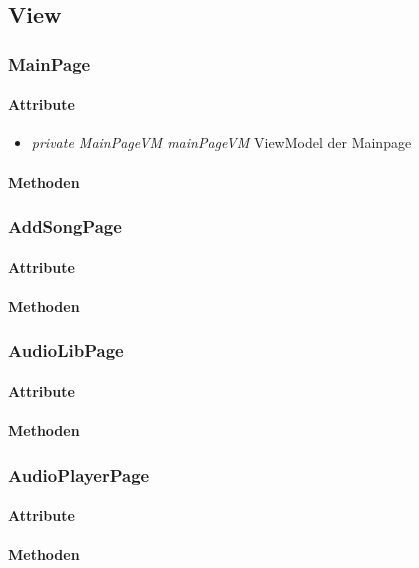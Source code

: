 \documentclass[../entwurf.tex]{subfiles}
\begin{document}
\newcommand{\attr}[1]{\item \textit{#1}}

\subsection{View}
\subsubsection{MainPage}
\paragraph{Attribute}
\begin{itemize}
	\attr{private MainPageVM  mainPageVM} ViewModel der Mainpage
\end{itemize}
\paragraph{Methoden}
\subsubsection{AddSongPage}
\paragraph{Attribute}
\paragraph{Methoden}
\subsubsection{AudioLibPage}
\paragraph{Attribute}
\paragraph{Methoden}
\subsubsection{AudioPlayerPage}
\paragraph{Attribute}
\paragraph{Methoden}
\end{document}
